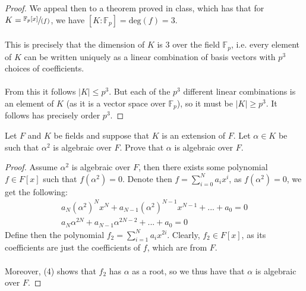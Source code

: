 \documentclass[12pt]{article}
\newenvironment{ex}[2][Exercise]{\begin{trivlist}
\item[\hskip \labelsep {\bfseries #1}\hskip \labelsep {\bfseries #2.}]}{\end{trivlist}}
\begin{document}
\begin{ex}{2}
\begin{enumerate}[label=(\alph*)]
\begin{proof}
            We appeal then to a theorem proved in class, which has that for $K = \sfrac{\mathbb{F}_p[x]}{(f)}$, we have $[K : \mathbb{F}_p] = \text{deg}(f) = 3$. \\ \\
            This is precisely that the dimension of $K$ is $3$ over the field $\mathbb{F}_p$, i.e. every element of $K$ can be written uniquely as a linear combination of basis vectors with $p^3$ choices of coefficients. \\ \\
            From this it follows $|K| \leq p^3$. But each of the $p^3$ different linear combinations is an element of $K$ (as it is a vector space over $\mathbb{F}_p$), so it must be $|K| \geq p^3$. It follows has precisely order $p^3$. 
        \end{proof}
    \end{enumerate}
\end{ex}

\begin{ex}{3}
    Let $F$ and $K$ be fields and suppose that $K$ is an extension of $F$. Let $\alpha \in K$ be such that $\alpha^2$ is algebraic over $F$. Prove that $\alpha$ is algebraic over $F$.
    \begin{proof}
        Assume $\alpha^2$ is algebraic over $F$, then there exists some polynomial $f \in F[x]$ such that $f(\alpha^2) = 0$. Denote then $f = \sum_{i = 0}^N a_ix^i$, as $f(\alpha^2) = 0$, we get the following:
        \begin{equation}
            \begin{aligned}
                a_N(\alpha^2)^Nx^N + a_{N-1}(\alpha^2)^{N-1}x^{N-1} + ... + a_0 = 0 \\
                a_N\alpha^{2N} + a_{N-1}\alpha^{2N - 2} + ... + a_0 = 0
            \end{aligned}
        \end{equation}
        Define then the polynomial $f_2 = \sum_{i = 1}^N a_ix^{2i}$. Clearly, $f_2 \in F[x]$, as its coefficients are just the coefficients of $f$, which are from $F$. \\ \\
        Moreover, (4) shows that $f_2$ has $\alpha$ as a root, so we thus have that $\alpha$ is algebraic over $F$.
    \end{proof}
\end{ex}
\end{document}
